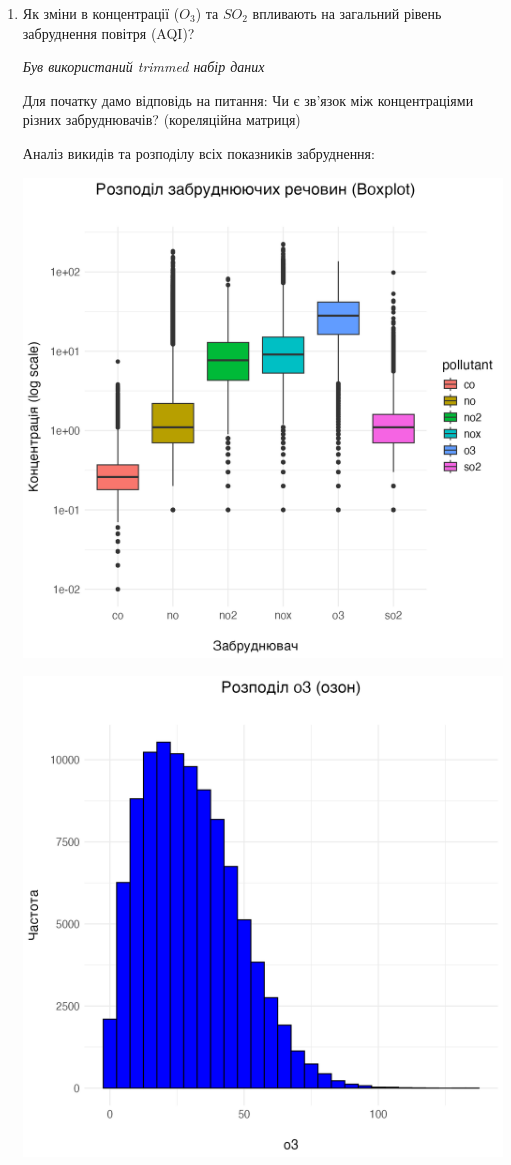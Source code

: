 \documentclass[./report.tex]{subfiles}
\begin{document}
\begin{enumerate}
  \pagebreak

  \item Як зміни в концентрації ($O_3$) та $SO_2$ впливають на загальний рівень забруднення повітря (AQI)?

  \quad \textit{Був використаний trimmed набір даних}

  Для початку дамо відповідь на питання:
  Чи є зв’язок між концентраціями різних забруднювачів? (кореляційна матриця)

  Аналіз викидів та розподілу всіх показників забруднення:

  \includegraphics[width=\linewidth]{plots/question2/boxplot_pollutants.png}

  \includegraphics[width=\linewidth]{plots/question2/o3_plot.png}


\end{enumerate}
\end{document}
